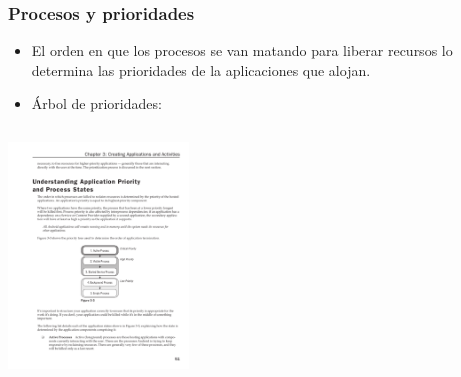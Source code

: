 \documentclass[hyperref={pdfpagelabels=true},ucs]{beamer}
\begin{document}
\begin{frame}[shrink=30]
\frametitle{Procesos y prioridades}

\begin{itemize}
\item El orden en que los procesos se van matando para liberar
  recursos lo determina las prioridades de la aplicaciones que alojan.
\item Árbol de prioridades:

\end{itemize}

  \begin{columns}[c]


\column{52mm}

    \begin{center}
      \includegraphics[height=60mm]{figs/PAAD-p51}
    \end{center}

\column{100mm}


\end{columns}
\end{frame}
\end{document}
